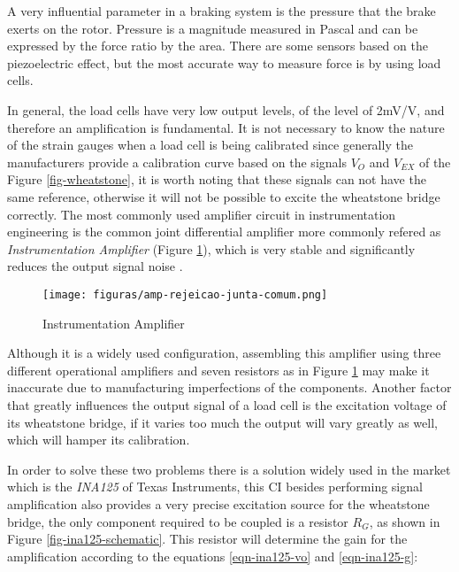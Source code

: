 		A very influential parameter in a braking system is the pressure that the brake exerts on the rotor. Pressure is a magnitude measured in Pascal and can be expressed by the force ratio by the area. There are some sensors based on the piezoelectric effect, but the most accurate way to measure force is by using load cells.

		
		In general, the load cells have very low output levels, of the level of 2mV/V, and therefore an amplification is fundamental. It is not necessary to know the nature of the strain gauges when a load cell is being calibrated since generally the manufacturers provide a calibration curve based on the signals $V_{O}$ and $V_{EX}$ of the Figure \ref{fig-wheatstone}, it is worth noting that these signals can not have the same reference, otherwise it will not be possible to excite the wheatstone bridge correctly. The most commonly used amplifier circuit in instrumentation engineering is the common joint differential amplifier more commonly refered as \textit{Instrumentation Amplifier} (Figure \ref{fig-instrumentation-amplifier}), which is very stable and significantly reduces the output signal noise \cite{wait1975introduction}.

		\begin{figure}[htbp]
			\centering
				\texttt{[image: figuras/amp-rejeicao-junta-comum.png]}
			\caption{Instrumentation Amplifier \cite{3opamp}}
			\label{fig-instrumentation-amplifier}
		\end{figure}


		Although it is a widely used configuration, assembling this amplifier using three different operational amplifiers and seven resistors as in Figure \ref{fig-instrumentation-amplifier} may make it inaccurate due to manufacturing imperfections of the components. Another factor that greatly influences the output signal of a load cell is the excitation voltage of its wheatstone bridge, if it varies too much the output will vary greatly as well, which will hamper its calibration.
		
		
		In order to solve these two problems there is a solution widely used in the market which is the \textit{INA125} of Texas Instruments, this CI besides performing signal amplification also provides a very precise excitation source for the wheatstone bridge, the only component required to be coupled is a resistor $R_{G}$, as shown in Figure \ref{fig-ina125-schematic}. This resistor will determine the gain for the amplification according to the equations \ref{eqn-ina125-vo} and \ref{eqn-ina125-g}:
	

